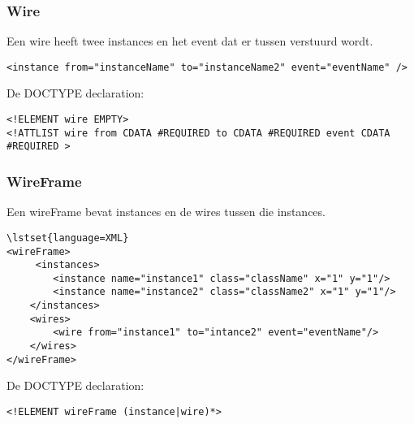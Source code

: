 \documentclass[]{article}
\begin{document}
\subsubsection{Wire}
Een wire heeft twee instances en het event dat er tussen verstuurd wordt.
\lstset{language=XML}
\begin{lstlisting}
<instance from="instanceName" to="instanceName2" event="eventName" />
\end{lstlisting}
De DOCTYPE declaration: 
\lstset{language=XML}
\begin{lstlisting}
<!ELEMENT wire EMPTY>
<!ATTLIST wire from CDATA #REQUIRED to CDATA #REQUIRED event CDATA #REQUIRED >
\end{lstlisting}
\subsubsection{WireFrame}
Een wireFrame bevat instances en de wires tussen die instances.
\begin{lstlisting}
\lstset{language=XML}
<wireFrame>
     <instances>
	    <instance name="instance1" class="className" x="1" y="1"/>
	    <instance name="instance2" class="className2" x="1" y="1"/>
	</instances>
	<wires>
	    <wire from="instance1" to="intance2" event="eventName"/>
	</wires>
</wireFrame>	
\end{lstlisting}
De DOCTYPE declaration: 
\lstset{language=XML}
\begin{lstlisting}
<!ELEMENT wireFrame (instance|wire)*>
\end{lstlisting}
\end{document}
